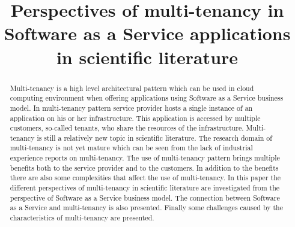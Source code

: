 \documentclass[conference]{sasmoota2017}
\begin{document}
%
\title{Perspectives of multi-tenancy in Software as a Service applications in scientific literature}


\author{
}


\maketitle

\begin{abstract}

Multi-tenancy is a high level architectural pattern which can be used in cloud computing environment when offering applications using Software as a Service business model. In multi-tenancy pattern service provider hosts a single instance of an application on his or her infrastructure. This application is accessed by multiple customers, so-called tenants, who share the resources of the infrastructure. Multi-tenancy is still a relatively new topic in scientific literature. The research domain of multi-tenancy is not yet mature which can be seen from the lack of industrial experience reports on multi-tenancy. The use of multi-tenancy pattern brings multiple benefits both to the service provider and to the customers. In addition to the benefits there are also some complexities that affect the use of multi-tenancy. In this paper the different perspectives of multi-tenancy in scientific literature are investigated from the perspective of Software as a Service business model. The connection between Software as a Service and multi-tenancy is also presented. Finally some challenges caused by the characteristics of multi-tenancy are presented. 

\end{abstract}
\end{document}
